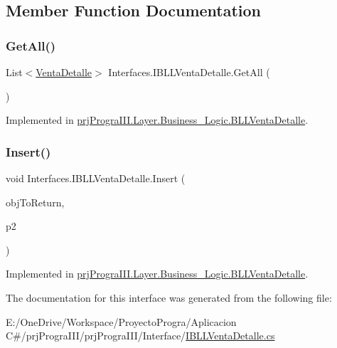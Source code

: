 \subsection{Member Function Documentation}
\hypertarget{interface_interfaces_1_1_i_b_l_l_venta_detalle_af009e6d0db3ad9f1adf7ea8e00efc7f6}{}\label{interface_interfaces_1_1_i_b_l_l_venta_detalle_af009e6d0db3ad9f1adf7ea8e00efc7f6} 
\subsubsection{\texorpdfstring{Get\+All()}{GetAll()}}
{\footnotesize\ttfamily List$<$\hyperlink{classprj_progra_i_i_i_1_1_layer_1_1_entities_1_1_venta_detalle}{Venta\+Detalle}$>$ Interfaces.\+I\+B\+L\+L\+Venta\+Detalle.\+Get\+All (\begin{DoxyParamCaption}{ }\end{DoxyParamCaption})}



Implemented in \hyperlink{classprj_progra_i_i_i_1_1_layer_1_1_business___logic_1_1_b_l_l_venta_detalle_a27f26563248d0c13754d69442e6f7a0a}{prj\+Progra\+I\+I\+I.\+Layer.\+Business\+\_\+\+Logic.\+B\+L\+L\+Venta\+Detalle}.

\hypertarget{interface_interfaces_1_1_i_b_l_l_venta_detalle_a3025cdae5e97d2097996fec8f11de409}{}\label{interface_interfaces_1_1_i_b_l_l_venta_detalle_a3025cdae5e97d2097996fec8f11de409} 
\subsubsection{\texorpdfstring{Insert()}{Insert()}}
{\footnotesize\ttfamily void Interfaces.\+I\+B\+L\+L\+Venta\+Detalle.\+Insert (\begin{DoxyParamCaption}\item[{\hyperlink{classprj_progra_i_i_i_1_1_layer_1_1_entities_1_1_venta_detalle}{Venta\+Detalle}}]{obj\+To\+Return,  }\item[{int}]{p2 }\end{DoxyParamCaption})}



Implemented in \hyperlink{classprj_progra_i_i_i_1_1_layer_1_1_business___logic_1_1_b_l_l_venta_detalle_a5d13037ef7919552e90d8f6a50862db4}{prj\+Progra\+I\+I\+I.\+Layer.\+Business\+\_\+\+Logic.\+B\+L\+L\+Venta\+Detalle}.



The documentation for this interface was generated from the following file\+:\begin{DoxyCompactItemize}
\item 
E\+:/\+One\+Drive/\+Workspace/\+Proyecto\+Progra/\+Aplicacion C\#/prj\+Progra\+I\+I\+I/prj\+Progra\+I\+I\+I/\+Interface/\hyperlink{_i_b_l_l_venta_detalle_8cs}{I\+B\+L\+L\+Venta\+Detalle.\+cs}\end{DoxyCompactItemize}

